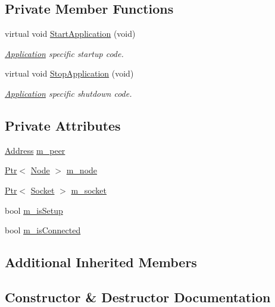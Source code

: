\subsection*{Private Member Functions}
\begin{DoxyCompactItemize}
\item 
virtual void \hyperlink{classns3_1_1SocketWriter_a7a18983adfee3cea0f4fc475705abb28}{Start\+Application} (void)
\begin{DoxyCompactList}\small\item\em \hyperlink{classns3_1_1Application}{Application} specific startup code. \end{DoxyCompactList}\item 
virtual void \hyperlink{classns3_1_1SocketWriter_a24494a9fb10911a35fbbd4f3bf550af9}{Stop\+Application} (void)
\begin{DoxyCompactList}\small\item\em \hyperlink{classns3_1_1Application}{Application} specific shutdown code. \end{DoxyCompactList}\end{DoxyCompactItemize}
\subsection*{Private Attributes}
\begin{DoxyCompactItemize}
\item 
\hyperlink{classns3_1_1Address}{Address} \hyperlink{classns3_1_1SocketWriter_a12642367feaffae4025998e57c66e9d6}{m\+\_\+peer}
\item 
\hyperlink{classns3_1_1Ptr}{Ptr}$<$ \hyperlink{classns3_1_1Node}{Node} $>$ \hyperlink{classns3_1_1SocketWriter_aa01731157f8776513569dc880e8e7003}{m\+\_\+node}
\item 
\hyperlink{classns3_1_1Ptr}{Ptr}$<$ \hyperlink{classns3_1_1Socket}{Socket} $>$ \hyperlink{classns3_1_1SocketWriter_acac6d81dbeee13777f27140b054a0a57}{m\+\_\+socket}
\item 
bool \hyperlink{classns3_1_1SocketWriter_aa701516e20284925fffc63641d8fb778}{m\+\_\+is\+Setup}
\item 
bool \hyperlink{classns3_1_1SocketWriter_acc08aca23e3ca2316594deec11caeaf8}{m\+\_\+is\+Connected}
\end{DoxyCompactItemize}
\subsection*{Additional Inherited Members}


\subsection{Constructor \& Destructor Documentation}
